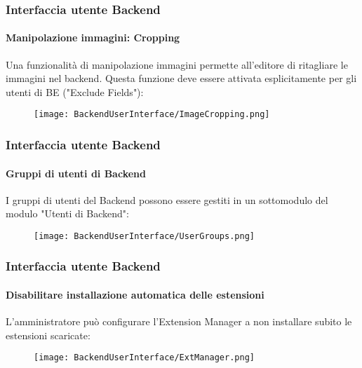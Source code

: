 \begin{frame}[fragile]
	\frametitle{Interfaccia utente Backend}
	\framesubtitle{Manipolazione immagini: Cropping}

	Una funzionalità di manipolazione immagini permette all'editore di ritagliare le immagini nel backend.
	Questa funzione deve essere attivata esplicitamente per gli utenti di BE ("Exclude Fields"):

	\begin{figure}
		\texttt{[image: BackendUserInterface/ImageCropping.png]}
	\end{figure}

\end{frame}

\begin{frame}[fragile]
	\frametitle{Interfaccia utente Backend}
	\framesubtitle{Gruppi di utenti di Backend}

	I gruppi di utenti del Backend possono essere gestiti in un sottomodulo del modulo "Utenti di Backend":

	\begin{figure}
		\texttt{[image: BackendUserInterface/UserGroups.png]}
	\end{figure}

\end{frame}

\begin{frame}[fragile]
	\frametitle{Interfaccia utente Backend}
	\framesubtitle{Disabilitare installazione automatica delle estensioni}

	L'amministratore può configurare l'Extension Manager a non installare subito le
	estensioni scaricate:

	\begin{figure}
		\texttt{[image: BackendUserInterface/ExtManager.png]}
	\end{figure}

\end{frame}

